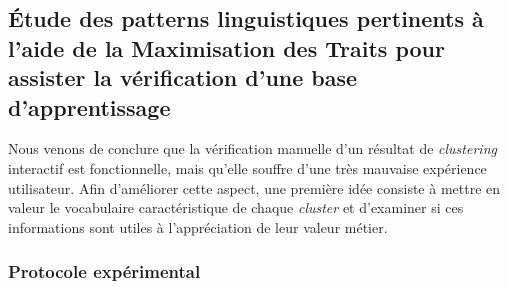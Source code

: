 	
	\subsection{Étude des patterns linguistiques pertinents à l'aide de la Maximisation des Traits pour assister la vérification d'une base d'apprentissage}
	\label{section:4.4.2-ETUDE-PERTINENCE-PATTERNS-LINGUISTIQUES}
		
		Nous venons de conclure que la vérification manuelle d'un résultat de \textit{clustering} interactif est fonctionnelle, mais qu'elle souffre d'une très mauvaise expérience utilisateur.
		Afin d'améliorer cette aspect, une première idée consiste à mettre en valeur le vocabulaire caractéristique de chaque \textit{cluster} et d'examiner si ces informations sont utiles à l'appréciation de leur valeur métier.
	
		\subsubsection{Protocole expérimental}
			
